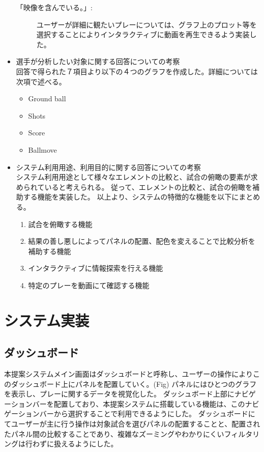 \documentclass[sotsuron]{kuee}
\begin{document}
\begin{itemize}
\begin{description}
							\item [「映像を含んでいる。」:]
							ユーザーが詳細に観たいプレーについては、グラフ上のプロット等を選択することによりインタラクティブに動画を再生できるよう実装した。
						\end{description}
					\item 選手が分析したい対象に関する回答についての考察
						\\回答で得られた７項目より以下の４つのグラフを作成した。詳細については次項で述べる。
							\begin{itemize}
								\item Ground ball
								\item Shots
								\item Score
								\item Ballmove
							\end{itemize}
					\item システム利用用途、利用目的に関する回答についての考察
						\\システム利用用途として様々なエレメントの比較と、試合の俯瞰の要素が求められていると考えられる。
						従って、エレメントの比較と、試合の俯瞰を補助する機能を実装した。
						以上より、システムの特徴的な機能を以下にまとめる。
						\begin{enumerate}	
							\item 試合を俯瞰する機能
							\item 結果の善し悪しによってパネルの配置、配色を変えることで比較分析を補助する機能
							\item インタラクティブに情報探索を行える機能
							\item 特定のプレーを動画にて確認する機能
						\end{enumerate}
				\end{itemize}
	\section{システム実装}
		\subsection{ダッシュボード}
			本提案システムメイン画面はダッシュボードと呼称し、ユーザーの操作によりこのダッシュボード上にパネルを配置していく。(Fig)
			パネルにはひとつのグラフを表示し、プレーに関するデータを視覚化した。
			ダッシュボード上部にナビゲーションバーを配置しており、本提案システムに搭載している機能は、このナビゲーションバーから選択することで利用できるようにした。
			ダッシュボードにてユーザーが主に行う操作は対象試合を選びパネルの配置することと、配置されたパネル間の比較することであり、複雑なズーミングやわかりにくいフィルタリングは行わずに扱えるようにした。
\end{document}
